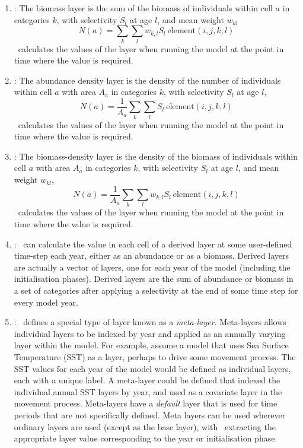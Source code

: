 \begin{enumerate}
\item {}: The biomass layer is the sum of the biomass of individuals within cell $a$ in categories $k$, with selectivity $S_l$ at age $l$, and mean weight $w_{kl}$
\begin{equation}
  N(a) = \sum\limits_{k} \sum\limits_l w_{k,l} S_l \ \text{element}(i,j,k,l) 
\end{equation}
\SPM\ calculates the values of the layer when running the model at the point in time where the value is required.

\item {}: The abundance density layer is the density of the number of individuals within cell $a$ with area $A_a$ in categories $k$, with selectivity $S_l$ at age $l$,
\begin{equation}
  N(a) = \frac{1}{A_a} \sum\limits_{k} \sum\limits_l S_l \ \text{element}(i,j,k,l)
\end{equation}
\SPM\ calculates the values of the layer when running the model at the point in time where the value is required.

\item {}: The biomass-density layer is the density of the biomass of individuals within cell $a$ with area $A_a$ in categories $k$, with selectivity $S_l$ at age $l$, and mean weight $w_{kl}$,
\begin{equation}
  N(a) = \frac{1}{A_a} \sum\limits_{k} \sum\limits_l w_{k,l} S_l \ \text{element}(i,j,k,l)
\end{equation}
\SPM\ calculates the values of the layer when running the model at the point in time where the value is required.

\item {\label{derived layer}}: \SPM\ can calculate the value in each cell of a derived layer at some user-defined time-step each year, either as an abundance or as a biomass. Derived layers are actually a vector of layers, one for each year of the model (including the initialisation phases). Derived layers are the sum of abundance or biomass in a set of categories after applying a selectivity at the end of some time step for every model year.

\item {\label{meta-layers}}: \SPM\ defines a special type of layer known as a \emph{meta-layer}. Meta-layers allows individual layers to be indexed by year and applied as an annually varying layer within the model. For example, assume a model that uses Sea Surface Temperature (SST) as a layer, perhaps to drive some movement process. The SST values for each year of the model would be defined as individual layers, each with a unique label. A meta-layer could be defined that indexed the individual annual SST layers by year, and used as a covariate layer in the movement process. Meta-layers have a \emph{default} layer that is used for time periods that are not specifically defined. Meta layers can be used wherever ordinary layers are used (except as  the base layer), with \SPM\ extracting the appropriate layer value corresponding to the year or initialisation phase.


\end{enumerate}
